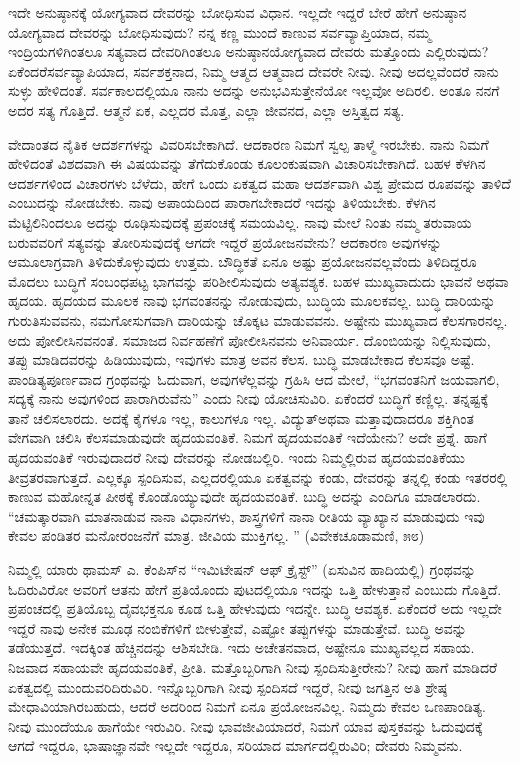 ಇದೇ ಅನುಷ್ಠಾನಕ್ಕೆ ಯೋಗ್ಯವಾದ ದೇವರನ್ನು ಬೋಧಿಸುವ ವಿಧಾನ. ಇಲ್ಲದೇ ಇದ್ದರೆ ಬೇರೆ ಹೇಗೆ ಅನುಷ್ಠಾನ ಯೋಗ್ಯವಾದ ದೇವರನ್ನು ಬೋಧಿಸುವುದು? ನನ್ನ ಕಣ್ಣ ಮುಂದೆ ಕಾಣುವ ಸರ್ವವ್ಯಾಪ್ತಿಯಾದ, ನಮ್ಮ ಇಂದ್ರಿಯಗಳಿಗಿಂತಲೂ ಸತ್ಯವಾದ ದೇವರಿಗಿಂತಲೂ ಅನುಷ್ಠಾನಯೋಗ್ಯವಾದ ದೇವರು ಮತ್ತೊಂದು ಎಲ್ಲಿರುವುದು? ಏಕೆಂದರೆ\break ಸರ್ವವ್ಯಾಪಿಯಾದ, ಸರ್ವಶಕ್ತನಾದ, ನಿಮ್ಮ ಆತ್ಮದ ಆತ್ಮವಾದ ದೇವರೇ ನೀವು. ನೀವು ಅದಲ್ಲವೆಂದರೆ ನಾನು ಸುಳ್ಳು ಹೇಳಿದಂತೆ. ಸರ್ವಕಾಲದಲ್ಲಿಯೂ ನಾನು ಅದನ್ನು ಅನುಭವಿಸುತ್ತೇನೆಯೋ ಇಲ್ಲವೋ ಅದಿರಲಿ. ಅಂತೂ ನನಗೆ ಅದರ ಸತ್ಯ ಗೊತ್ತಿದೆ. ಆತ್ಮನೆ ಏಕ, ಎಲ್ಲದರ ಮೊತ್ತ, ಎಲ್ಲಾ ಜೀವನದ, ಎಲ್ಲಾ ಅಸ್ತಿತ್ವದ ಸತ್ಯ. 

ವೇದಾಂತದ ನೈತಿಕ ಆದರ್ಶಗಳನ್ನು ವಿವರಿಸಬೇಕಾಗಿದೆ. ಆದಕಾರಣ ನಿಮಗೆ ಸ್ವಲ್ಪ ತಾಳ್ಮೆ ಇರಬೇಕು. ನಾನು ನಿಮಗೆ ಹೇಳಿದಂತೆ ವಿಶದವಾಗಿ ಈ ವಿಷಯವನ್ನು ತೆಗೆದುಕೊಂಡು ಕೂಲಂಕುಷವಾಗಿ ವಿಚಾರಿಸಬೇಕಾಗಿದೆ. ಬಹಳ ಕೆಳಗಿನ ಆದರ್ಶಗಳಿಂದ ವಿಚಾರಗಳು ಬೆಳೆದು, ಹೇಗೆ ಒಂದು ಏಕತ್ವದ ಮಹಾ ಆದರ್ಶವಾಗಿ ವಿಶ್ವ ಪ್ರೇಮದ ರೂಪವನ್ನು ತಾಳಿದೆ ಎಂಬುದನ್ನು ನೋಡಬೇಕು. ನಾವು ಅಪಾಯದಿಂದ ಪಾರಾಗಬೇಕಾದರೆ ಇದನ್ನು ತಿಳಿಯಬೇಕು. ಕೆಳಗಿನ ಮೆಟ್ಟಿಲಿನಿಂದಲೂ ಅದನ್ನು ರೂಢಿಸುವುದಕ್ಕೆ ಪ್ರಪಂಚಕ್ಕೆ ಸಮಯವಿಲ್ಲ. ನಾವು ಮೇಲೆ ನಿಂತು ನಮ್ಮ ತರುವಾಯ ಬರುವವರಿಗೆ ಸತ್ಯವನ್ನು ತೋರಿಸುವುದಕ್ಕೆ ಆಗದೇ ಇದ್ದರೆ ಪ್ರಯೋಜನವೇನು? ಆದಕಾರಣ ಅವುಗಳನ್ನು ಆಮೂಲಾಗ್ರವಾಗಿ ತಿಳಿದುಕೊಳ್ಳುವುದು ಉತ್ತಮ. ಬೌದ್ಧಿಕತೆ ಏನೂ ಅಷ್ಟು ಪ್ರಯೋಜನವಲ್ಲವೆಂದು ತಿಳಿದಿದ್ದರೂ ಮೊದಲು ಬುದ್ಧಿಗೆ ಸಂಬಂಧಪಟ್ಟ ಭಾಗವನ್ನು ಪರಿಶೀಲಿಸುವುದು ಅತ್ಯವಶ್ಯಕ. ಬಹಳ ಮುಖ್ಯವಾದುದು ಭಾವನೆ ಅಥವಾ ಹೃದಯ. ಹೃದಯದ ಮೂಲಕ ನಾವು ಭಗವಂತನನ್ನು ನೋಡುವುದು, ಬುದ್ಧಿಯ ಮೂಲಕವಲ್ಲ. ಬುದ್ಧಿ ದಾರಿಯನ್ನು ಗುರುತಿಸುವವನು, ನಮಗೋಸುಗವಾಗಿ ದಾರಿಯನ್ನು ಚೊಕ್ಕಟ ಮಾಡುವವನು. ಅಷ್ಟೇನು ಮುಖ್ಯವಾದ ಕೆಲಸಗಾರನಲ್ಲ. ಅದು ಪೋಲೀಸಿನವನಂತೆ. ಸಮಾಜದ ನಿರ್ವಹಣೆಗೆ ಪೋಲೀಸಿನವನು ಅನಿವಾರ್ಯ. ದೊಂಬಿಯನ್ನು ನಿಲ್ಲಿಸುವುದು, ತಪ್ಪು ಮಾಡಿದವರನ್ನು ಹಿಡಿಯುವುದು, ಇವುಗಳು ಮಾತ್ರ ಅವನ ಕೆಲಸ. ಬುದ್ಧಿ ಮಾಡಬೇಕಾದ ಕೆಲಸವೂ ಅಷ್ಟೆ. ಪಾಂಡಿತ್ಯಪೂರ್ಣವಾದ ಗ್ರಂಥವನ್ನು ಓದುವಾಗ, ಅವುಗಳೆಲ್ಲವನ್ನು ಗ್ರಹಿಸಿ ಆದ ಮೇಲೆ, “ಭಗವಂತನಿಗೆ ಜಯವಾಗಲಿ, ಸದ್ಯಕ್ಕೆ ನಾನು ಅವುಗಳಿಂದ ಪಾರಾಗಿರುವೆನು” ಎಂದು ನೀವು ಯೋಚಿಸುವಿರಿ. ಏಕೆಂದರೆ ಬುದ್ಧಿಗೆ ಕಣ್ಣಿಲ್ಲ. ತನ್ನಷ್ಟಕ್ಕೆ ತಾನೆ ಚಲಿಸಲಾರದು. ಅದಕ್ಕೆ ಕೈಗಳೂ ಇಲ್ಲ, ಕಾಲುಗಳೂ ಇಲ್ಲ. ವಿದ್ಯುತ್​ ಅಥವಾ ಮತ್ತಾವುದಾದರೂ ಶಕ್ತಿಗಿಂತ ವೇಗವಾಗಿ ಚಲಿಸಿ ಕೆಲಸಮಾಡುವುದೇ ಹೃದಯವಂತಿಕೆ. ನಿಮಗೆ ಹೃದಯವಂತಿಕೆ ಇದೆಯೇನು? ಅದೇ ಪ್ರಶ್ನೆ. ಹಾಗೆ ಹೃದಯವಂತಿಕೆ ಇರುವುದಾದರೆ ನೀವು ದೇವರನ್ನು ನೋಡಬಲ್ಲಿರಿ. ಇಂದು ನಿಮ್ಮಲ್ಲಿರುವ ಹೃದಯವಂತಿಕೆಯು ತೀವ್ರತರವಾಗುತ್ತದೆ. ಎಲ್ಲಕ್ಕೂ ಸ್ಪಂದಿಸುವ, ಎಲ್ಲದರಲ್ಲಿಯೂ ಏಕತ್ವವನ್ನು ಕಂಡು, ದೇವರನ್ನು ತನ್ನಲ್ಲಿ ಕಂಡು ಇತರರಲ್ಲಿ ಕಾಣುವ ಮಹೋನ್ನತ ಪೀಠಕ್ಕೆ ಕೊಂಡೊಯ್ಯುವುದೇ ಹೃದಯವಂತಿಕೆ. ಬುದ್ಧಿ ಅದನ್ನು ಎಂದಿಗೂ ಮಾಡಲಾರದು. “ಚಮತ್ಕಾರವಾಗಿ ಮಾತನಾಡುವ ನಾನಾ ವಿಧಾನಗಳು, ಶಾಸ್ತ್ರಗಳಿಗೆ ನಾನಾ ರೀತಿಯ ವ್ಯಾಖ್ಯಾನ ಮಾಡುವುದು ಇವು ಕೇವಲ ಪಂಡಿತರ ಮನೋರಂಜನೆಗೆ ಮಾತ್ರ. ಜೀವಿಯ ಮುಕ್ತಿಗಲ್ಲ. ” (ವಿವೇಕಚೂಡಾಮಣಿ, ೫೮)

ನಿಮ್ಮಲ್ಲಿ ಯಾರು ಥಾಮಸ್​ ಎ. ಕೆಂಪಿಸ್​ನ “ಇಮಿಟೇಷನ್​ ಆಫ್​ ಕ್ರೈಸ್ಟ್​” (ಏಸುವಿನ ಹಾದಿಯಲ್ಲಿ) ಗ್ರಂಥವನ್ನು ಓದಿರುವಿರೋ ಅವರಿಗೆ ಆತನು ಹೇಗೆ ಪ್ರತಿಯೊಂದು ಪುಟದಲ್ಲಿಯೂ ಇದನ್ನು ಒತ್ತಿ ಹೇಳುತ್ತಾನೆ ಎಂಬುದು ಗೊತ್ತಿದೆ. ಪ್ರಪಂಚದಲ್ಲಿ ಪ್ರತಿಯೊಬ್ಬ ದೈವಭಕ್ತನೂ ಕೂಡ ಒತ್ತಿ ಹೇಳುವುದು ಇದನ್ನೇ. ಬುದ್ಧಿ ಆವಶ್ಯಕ. ಏಕೆಂದರೆ ಅದು ಇಲ್ಲದೇ ಇದ್ದರೆ ನಾವು ಅನೇಕ ಮೂಢ ನಂಬಿಕೆಗಳಿಗೆ ಬೀಳುತ್ತೇವೆ, ಎಷ್ಟೋ ತಪ್ಪುಗಳನ್ನು ಮಾಡುತ್ತೇವೆ. ಬುದ್ಧಿ ಅವನ್ನು ತಡೆಯುತ್ತದೆ. ಇದಕ್ಕಿಂತ ಹೆಚ್ಚಿನದನ್ನು ಆಶಿಸಬೇಡಿ. ಇದು ಅಚೇತನವಾದ, ಅಷ್ಟೇನೂ ಮುಖ್ಯವಲ್ಲದ ಸಹಾಯ. ನಿಜವಾದ ಸಹಾಯವೇ ಹೃದಯವಂತಿಕೆ, ಪ್ರೀತಿ. ಮತ್ತೊಬ್ಬರಿಗಾಗಿ ನೀವು ಸ್ಪಂದಿಸುತ್ತೀರೇನು? ನೀವು ಹಾಗೆ ಮಾಡಿದರೆ ಏಕತ್ವದಲ್ಲಿ ಮುಂದುವರಿದಿರುವಿರಿ. ಇನ್ನೊಬ್ಬರಿಗಾಗಿ ನೀವು ಸ್ಪಂದಿಸದೆ ಇದ್ದರೆ, ನೀವು ಜಗತ್ತಿನ ಅತಿ ಶ್ರೇಷ್ಠ ಮೇಧಾವಿಯಾಗಿರಬಹುದು, ಆದರೆ ಅದರಿಂದ ನಿಮಗೆ ಏನೂ ಪ್ರಯೋಜನವಿಲ್ಲ. ನಿಮ್ಮದು ಕೇವಲ ಒಣಪಾಂಡಿತ್ಯ. ನೀವು ಮುಂದೆಯೂ ಹಾಗೆಯೇ ಇರುವಿರಿ. ನೀವು ಭಾವಜೀವಿಯಾದರೆ, ನಿಮಗೆ ಯಾವ ಪುಸ್ತಕವನ್ನು ಓದುವುದಕ್ಕೆ ಆಗದೆ ಇದ್ದರೂ, ಭಾಷಾಜ್ಞಾನವೇ ಇಲ್ಲದೇ ಇದ್ದರೂ, ಸರಿಯಾದ ಮಾರ್ಗದಲ್ಲಿರುವಿರಿ; ದೇವರು ನಿಮ್ಮವನು. 


